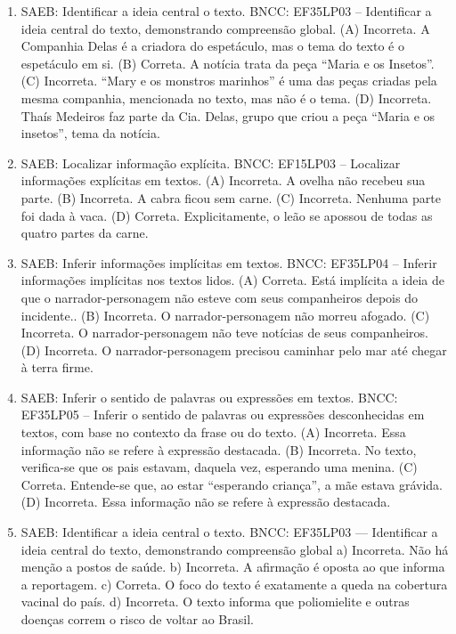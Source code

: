 \begin{enumerate}
\item
SAEB: Identificar a ideia central o texto.
BNCC: EF35LP03 -- Identificar a ideia central do texto, demonstrando
compreensão global.
(A) Incorreta. A Companhia Delas é a criadora do espetáculo, mas o tema do texto é o espetáculo em si.
(B) Correta. A notícia trata da peça ``Maria e os Insetos''.
(C) Incorreta. ``Mary e os monstros marinhos'' é uma das peças criadas
pela mesma companhia, mencionada no texto, mas não é o tema.
(D) Incorreta. Thaís Medeiros faz parte da Cia. Delas, grupo que criou a
peça ``Maria e os insetos'', tema da notícia.

\item
SAEB: Localizar informação explícita.
BNCC: EF15LP03 -- Localizar informações explícitas em textos.
(A) Incorreta. A ovelha não recebeu sua parte.
(B) Incorreta. A cabra ficou sem carne.
(C) Incorreta. Nenhuma parte foi dada à vaca.
(D) Correta. Explicitamente, o leão se apossou de todas as quatro partes da carne.

\item
SAEB: Inferir informações implícitas em textos.
BNCC: EF35LP04 -- Inferir informações implícitas nos textos lidos.
(A) Correta. Está implícita a ideia de que o narrador-personagem não esteve com seus companheiros depois do incidente..
(B) Incorreta. O narrador-personagem não morreu afogado.
(C) Incorreta. O narrador-personagem não teve notícias de seus companheiros.
(D) Incorreta. O narrador-personagem precisou caminhar pelo mar até chegar à terra firme.

\item
SAEB: Inferir o sentido de palavras ou expressões em textos.
BNCC: EF35LP05 -- Inferir o sentido de palavras ou expressões
desconhecidas em textos, com base no contexto da frase ou do texto.
(A) Incorreta. Essa informação não se refere à expressão destacada.
(B) Incorreta. No texto, verifica-se que os pais estavam, daquela vez,
esperando uma menina.
(C) Correta. Entende-se que, ao estar ``esperando criança'', a mãe estava
grávida.
(D) Incorreta. Essa informação não se refere à expressão destacada.

\item
SAEB: Identificar a ideia central o texto. BNCC: EF35LP03 --- Identificar a ideia central do texto, demonstrando compreensão global a) Incorreta. Não há menção a postos de saúde. b) Incorreta. A afirmação é oposta ao que informa a reportagem. c) Correta. O foco do texto é exatamente a queda na cobertura vacinal do país. d) Incorreta. O texto informa que poliomielite e outras doenças correm o risco de voltar ao Brasil.


\end{enumerate}

